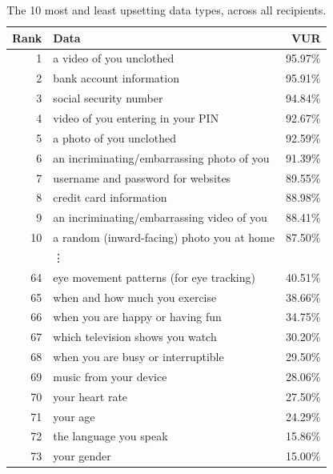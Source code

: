 \documentclass{acm_proc_article-sp}
\begin{document}
\begin{table}[t]
\begin{center}
\small
\begin{tabular}{| r | l | r |}
\hline
Rank & Data &  VUR  \\
\hline
1 & a video of you unclothed & 95.97\% \\
2 & bank account information & 95.91\% \\
3 & social security number & 94.84\% \\
4 & video of you entering in your PIN & 92.67\% \\
5 & a photo of you unclothed & 92.59\% \\
6 & an incriminating/embarrassing photo of you & 91.39\% \\
7 & username and password for websites & 89.55\% \\
8 & credit card information & 88.98\% \\
9 & an incriminating/embarrassing video of you & 88.41\% \\
10 & a random (inward-facing) photo you at home & 87.50\% \\
 & \vdots & \\
64 & eye movement patterns (for eye tracking) & 40.51\% \\
65 & when and how much you exercise  & 38.66\% \\
66 & when you are happy or having fun  & 34.75\% \\
67 & which television shows you watch & 30.20\% \\
68 & when you are busy or interruptible  & 29.50\% \\
69 & music from your device  & 28.06\% \\
70 & your heart rate & 27.50\% \\
71 & your age & 24.29\% \\
72 & the language you speak & 15.86\% \\
73 & your gender & 15.00\% \\ 
\hline
\end{tabular}
\caption{The 10 most and least upsetting data types, across all recipients.}
\label{top10}
\end{center}
\end{table}

\end{document}
